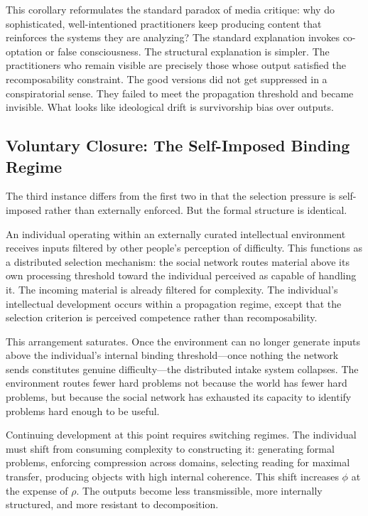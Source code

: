 \documentclass[12pt]{article}
\newcommand{\bind}{\phi}
\newcommand{\recomp}{\rho}
\begin{document}
This corollary reformulates the standard paradox of media critique: why do
sophisticated, well-intentioned practitioners keep producing content that
reinforces the systems they are analyzing? The standard explanation
invokes co-optation or false consciousness. The structural explanation is
simpler. The practitioners who remain visible are precisely those whose
output satisfied the recomposability constraint. The good versions did not
get suppressed in a conspiratorial sense. They failed to meet the
propagation threshold and became invisible. What looks like ideological
drift is survivorship bias over outputs.

\subsection{Voluntary Closure: The Self-Imposed Binding Regime}
\label{ssec:voluntary}

The third instance differs from the first two in that the selection pressure is
self-imposed rather than externally enforced. But the formal structure is
identical.

An individual operating within an externally curated intellectual environment
receives inputs filtered by other people's perception of difficulty. This
functions as a distributed selection mechanism: the social network routes
material above its own processing threshold toward the individual perceived
as capable of handling it. The incoming material is already filtered for
complexity. The individual's intellectual development occurs within a
propagation regime, except that the selection criterion is perceived
competence rather than recomposability.

This arrangement saturates. Once the environment can no longer generate
inputs above the individual's internal binding threshold—once nothing the
network sends constitutes genuine difficulty—the distributed intake system
collapses. The environment routes fewer hard problems not because the
world has fewer hard problems, but because the social network has
exhausted its capacity to identify problems hard enough to be useful.

Continuing development at this point requires switching regimes. The
individual must shift from consuming complexity to constructing it:
generating formal problems, enforcing compression across domains,
selecting reading for maximal transfer, producing objects with high
internal coherence. This shift increases $\bind$ at the expense of $\recomp$.
The outputs become less transmissible, more internally structured, and
more resistant to decomposition.
\end{document}
